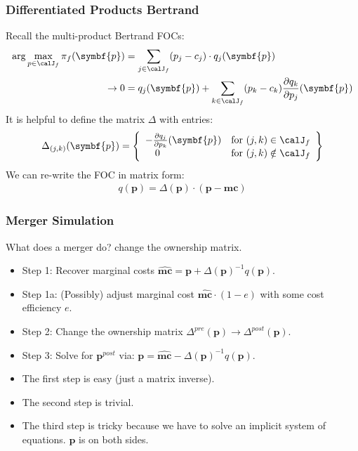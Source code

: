 \begin{frame}
\frametitle{Differentiated Products Bertrand}
\small
Recall the multi-product Bertrand FOCs:
\begin{align*}
\arg \max_{p \in \calJ_f} \pi_f (\symbf{p}) &= \sum_{j \in \calJ_f} (p_j - c_j) \cdot q_j(\symbf{p}) \\
\rightarrow 0&= q_j(\symbf{p}) + \sum_{k \in \calJ_f} (p_k - c_k) \frac{\partial q_{k}}{\partial p_j}(\symbf{p})
\end{align*}
It is helpful to define the matrix $\Delta$ with entries:
\begin{align*}
\Delta_{(j,k)}(\symbf{p}) = \left\{\begin{array}{lr}
         - \frac{\partial q_{j}}{\partial p_k}(\symbf{p}) & \text{for }  (j,k) \in \calJ_f\\
       	  \quad 0 & \text{for } (j,k) \notin \calJ_f
        \end{array} \right\}
\end{align*}
We can re-write the FOC in matrix form:
\begin{align*}
q(\symbf{p}) = \Delta(\symbf{p})\cdot(\symbf{p}-\symbf{mc})
\end{align*}
\end{frame}

\begin{frame}
\frametitle{Merger Simulation}
What does a merger do? \alert{change the ownership matrix}.
\begin{itemize}

\item Step 1: Recover marginal costs $\widehat{\symbf{mc}} = \symbf{p} +\Delta(\symbf{p})^{-1}q(\symbf{p})$.
\item Step 1a: (Possibly) adjust marginal cost $\widehat{\symbf{mc}}\cdot (1-e)$ with some cost efficiency $e$.
\item Step 2: Change the ownership matrix $\Delta^{pre}(\symbf{p}) \rightarrow \Delta^{post}(\symbf{p})$.
\item Step 3: Solve for $\symbf{p}^{post}$ via: $\symbf{p} = \widehat{\symbf{mc}} - \Delta(\symbf{p})^{-1}q(\symbf{p})$.
\end{itemize}
\pause
\vspace{0.5cm}
\begin{itemize}
\item The first step is easy (just a matrix inverse).
\item The second step is trivial.
\item The third step is tricky because we have to solve an implicit system of equations. $\symbf{p}$ is on both sides.
\end{itemize}
\end{frame}


